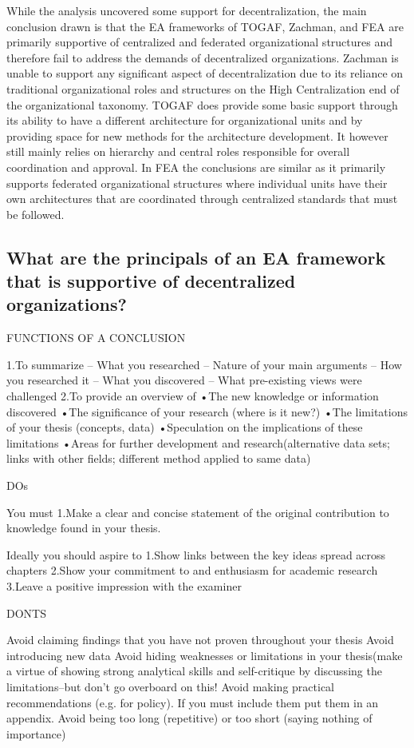 While the analysis uncovered some support for decentralization, the main conclusion drawn is that the EA frameworks of TOGAF, Zachman, and FEA are primarily supportive of centralized and federated organizational structures and therefore fail to address the demands of decentralized organizations. Zachman is unable to support any significant aspect of decentralization due to its reliance on traditional organizational roles and structures on the High Centralization end of the organizational taxonomy. TOGAF does provide some basic support through its ability to have a different architecture for organizational units and by providing space for new methods for the architecture development. It however still mainly relies on hierarchy and central roles responsible for overall coordination and approval. In FEA the conclusions are similar as it primarily supports federated organizational structures where individual units have their own architectures that are coordinated through centralized standards that must be followed.


\subsection{What are the principals of an EA framework that is supportive of decentralized organizations?}





FUNCTIONS OF A CONCLUSION

1.To summarize
 – What you researched 
 – Nature of your main arguments 
 – How you researched it 
 – What you discovered 
 – What pre-existing views were challenged
2.To provide an overview of 
•The new knowledge or information discovered
•The significance of your research (where is it new?)
•The limitations of your thesis (concepts, data)
•Speculation on the implications of these limitations
•Areas for further development and research(alternative data sets; links with other fields; different method applied to same data)


DOs

You must 
1.Make a clear and concise statement of the original contribution to knowledge found in your thesis.

Ideally you should aspire to
1.Show links between the key ideas spread across chapters
2.Show your commitment to and enthusiasm for academic research
3.Leave a positive impression with the examiner


DONTS

Avoid claiming findings that you have not proven throughout your thesis
Avoid introducing new data
Avoid hiding weaknesses or limitations in your thesis(make a virtue of showing strong analytical skills and self-critique by discussing the limitations--but don't go overboard on this!
Avoid making practical recommendations (e.g. for policy). If you must include them put them in an appendix.
Avoid being too long (repetitive) or too short (saying nothing of importance)


